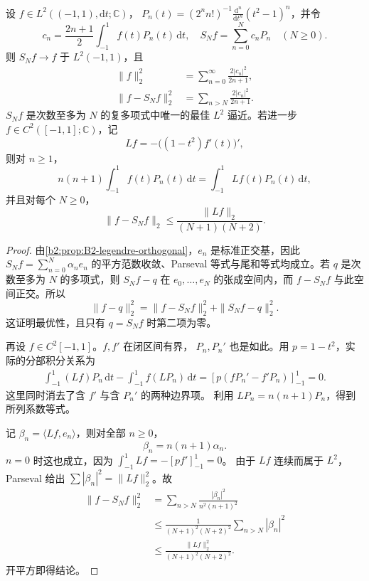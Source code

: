 \begin{proposition}
\label{b2:prop:B2-legendre-l2-error}
设 \(f\in L^2((-1,1),\mathrm dt;\mathbb C)\)，
\(P_n(t)=(2^nn!)^{-1}\frac{\mathrm d^n}{\mathrm dt^n}(t^2-1)^n\)，并令
\[
 c_n=\frac{2n+1}{2}\int_{-1}^1f(t)P_n(t)\,\mathrm dt,
 \quad
 S_Nf=\sum_{n=0}^Nc_nP_n
 \quad(N\ge0).
\]
则 \(S_Nf\to f\) 于 \(L^2(-1,1)\)，且
\[
\begin{aligned}
 \|f\|_2^2&=\sum_{n=0}^\infty\frac{2|c_n|^2}{2n+1},\\
 \|f-S_Nf\|_2^2
 &=\sum_{n>N}\frac{2|c_n|^2}{2n+1}.
\end{aligned}
\]
\(S_Nf\) 是次数至多为 \(N\) 的复多项式中唯一的最佳
\(L^2\) 逼近。若进一步 \(f\in C^2([-1,1];\mathbb C)\)，记
\[
 Lf=-\bigl((1-t^2)f'(t)\bigr)',
\]
则对 \(n\ge1\)，
\[
 n(n+1)\int_{-1}^1f(t)P_n(t)\,\mathrm dt
 =\int_{-1}^1Lf(t)P_n(t)\,\mathrm dt,
\]
并且对每个 \(N\ge0\)，
\[
 \|f-S_Nf\|_2
 \le\frac{\|Lf\|_2}{(N+1)(N+2)}.
\]
\end{proposition}
\begin{proof}
由\cref{b2:prop:B2-legendre-orthogonal}，\(e_n\) 是标准正交基，因此
\(S_Nf=\sum_{n=0}^N\alpha_ne_n\) 的平方范数收敛、Parseval 等式与尾和等式均成立。若 \(q\) 是次数至多为 \(N\) 的多项式，则
\(S_Nf-q\) 在 \(e_0,\ldots,e_N\) 的张成空间内，而
\(f-S_Nf\) 与此空间正交。所以
\[
 \|f-q\|_2^2
 =\|f-S_Nf\|_2^2+\|S_Nf-q\|_2^2.
\]
这证明最优性，且只有 \(q=S_Nf\) 时第二项为零。

再设 \(f\in C^2[-1,1]\)。\(f,f'\) 在闭区间有界，
\(P_n,P_n'\) 也是如此。用 \(p=1-t^2\)，实际的分部积分关系为
\[
\begin{aligned}
 \int_{-1}^1(Lf)P_n\,\mathrm dt
 -\int_{-1}^1f(LP_n)\,\mathrm dt
 =\left[p(fP_n'-f'P_n)\right]_{-1}^1=0.
\end{aligned}
\]
这里同时消去了含 \(f'\) 与含 \(P_n'\) 的两种边界项。
利用 \(LP_n=n(n+1)P_n\)，得到所列系数等式。

记 \(\beta_n=\langle Lf,e_n\rangle\)，则对全部 \(n\ge0\)，
\[
 \beta_n=n(n+1)\alpha_n.
\]
\(n=0\) 时这也成立，因为
\(\int_{-1}^1Lf=-[pf']_{-1}^1=0\)。
由于 \(Lf\) 连续而属于 \(L^2\)，Parseval 给出
\(\sum|\beta_n|^2=\|Lf\|_2^2\)。故
\[
\begin{aligned}
 \|f-S_Nf\|_2^2
 &=\sum_{n>N}
      \frac{|\beta_n|^2}{n^2(n+1)^2}\\
 &\le\frac1{(N+1)^2(N+2)^2}
      \sum_{n>N}|\beta_n|^2\\
 &\le\frac{\|Lf\|_2^2}{(N+1)^2(N+2)^2}.
\end{aligned}
\]
开平方即得结论。
\end{proof}

